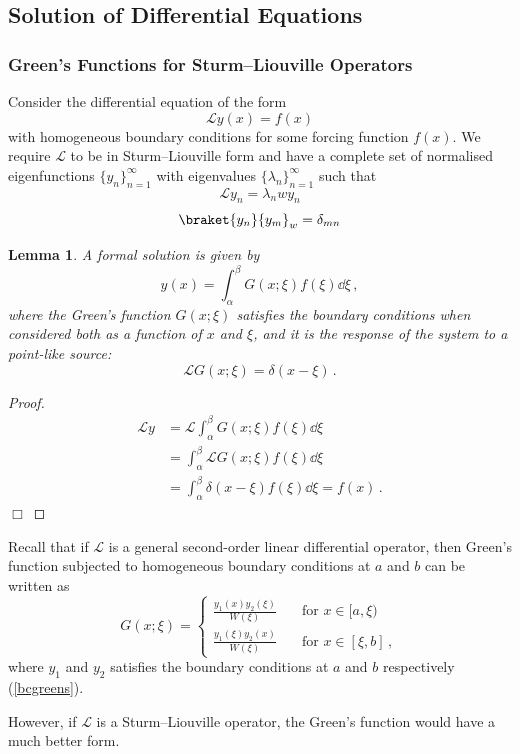 \documentclass{article}
\theoremstyle{plain}\theoremheaderfont{\normalfont\itshape}\theorembodyfont{\rmfamily}\theoremseparator{.}\newtheorem*{rem}{Remark}\newtheorem*{ex}{Example}\newtheorem*{proof}{Proof}\newtheorem*{altp}{Alternative proof}
\theoremstyle{plain}\theoremheaderfont{\normalfont\bfseries}\theorembodyfont{\rmfamily}\theoremseparator{.}\newtheorem{thm}{Theorem}[section]\newtheorem{lem}[thm]{Lemma}\newtheorem{prop}[thm]{Proposition}\newtheorem*{cor}{Corollary}\newtheorem{defn}[thm]{Definition}\newtheorem{clm}[thm]{Claim}\newtheorem{clminproof}{Claim}
\theoremstyle{break}\theoremheaderfont{\normalfont\itshape}\theorembodyfont{\rmfamily}\theoremseparator{.\medskip}\newtheorem*{proofskip}{Proof}\newtheorem*{exs}{Examples}\newtheorem*{rems}{Remarks}
\theoremstyle{break}\theoremheaderfont{\normalfont\bfseries}\theorembodyfont{\rmfamily}\theoremseparator{.\medskip}\newtheorem{lemskip}[thm]{Lemma}\newtheorem{defnskip}[thm]{Definition}\newtheorem{propskip}[thm]{Proposition}\newtheorem{thmskip}[thm]{Theorem}
\numberwithin{equation}{section}
\newcommand{\qed}{\hfill\ensuremath{\Box}}
\begin{document}
	\subsection{Solution of Differential Equations}
	\subsubsection{Green's Functions for Sturm--Liouville Operators}
	Consider the differential equation of the form
	\[\mathcal{L}y(x)=f(x)\]
	with homogeneous boundary conditions for some forcing function \(f(x)\). We require \(\mathcal{L}\) to be in Sturm--Liouville form and have a complete set of normalised eigenfunctions \(\{y_n\}_{n=1}^{\infty}\) with eigenvalues \(\{\lambda_n\}_{n=1}^{\infty}\) such that
	\[\mathcal{L}y_n=\lambda_n wy_n\]
	\[\braket{y_n}{y_m}_w=\delta_{mn}\]
	\begin{lem}
		A formal solution is given by
		\[y(x)=\int_{\alpha}^{\beta}G(x;\xi)f(\xi)\dd{\xi}\,,\]
		where the Green's function \(G(x;\xi)\) satisfies the boundary conditions when considered both as a function of \(x\) and \(\xi\), and it is the response of the system to a point-like source:
		\[\mathcal{L}G(x;\xi)=\delta(x-\xi)\,.\]
	\end{lem}
	\begin{proof}
		\begin{align*}
			\mathcal{L}y&=\mathcal{L}\int_{\alpha}^{\beta}G(x;\xi)f(\xi)\dd{\xi}\\
			&=\int_{\alpha}^{\beta}\mathcal{L}G(x;\xi)f(\xi)\dd{\xi}\\
			&=\int_{\alpha}^{\beta}\delta(x-\xi)f(\xi)\dd{\xi}=f(x)\,.
		\end{align*}\qed
	\end{proof}

	Recall that if \(\mathcal{L}\) is a general second-order linear differential operator, then Green's function subjected to homogeneous boundary conditions at \(a\) and \(b\) can be written as
	\[G(x;\xi)=\left\{\begin{aligned}
		\frac{y_1(x)y_2(\xi)}{W(\xi)} & \quad\text{for }x\in[a,\xi)\\
		\frac{y_1(\xi)y_2(x)}{W(\xi)} & \quad\text{for }x\in[\xi,b]\,,
	\end{aligned}\right.\]
	where \(y_1\) and \(y_2\) satisfies the boundary conditions at \(a\) and \(b\) respectively (\cref{bcgreens}).

	However, if \(\mathcal{L}\) is a Sturm--Liouville operator, the Green's function would have a much better form.
\end{document}
